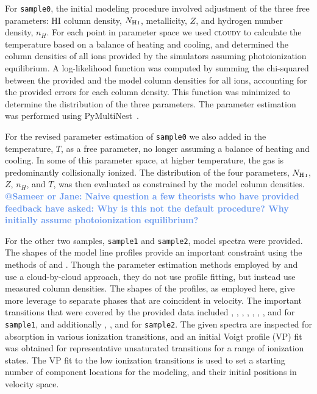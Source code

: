 \documentclass[fleqn,usenatbib]{mnras}
\makeatletter
\newcommand{\atsameer}[1]{\textcolor{CornflowerBlue}{\textbf{@Sameer or Jane: #1}}}
\makeatother
\begin{document}
For \texttt{sample0}, the initial modeling procedure involved adjustment of the three free parameters:
HI column density, $N_{\ion{H}{I}}$, metallicity, $Z$, and hydrogen number density, $n_H$.
For each point in parameter space we used \textsc{cloudy} to calculate the temperature based on a balance of heating and cooling,
and determined the column densities of all ions provided by the simulators assuming photoionization equilibrium.
A log-likelihood function was computed by summing the chi-squared between the provided and the model column densities for all ions, accounting for the provided errors for each column density.
This function was minimized to determine the distribution of the three parameters.
The parameter estimation was performed using PyMultiNest~\citep{buchner2014Statistical}. 

For the revised parameter estimation of \texttt{sample0} we also added in the temperature, $T$, as a free parameter, no longer assuming a balance of heating and cooling.
In some of this parameter space, at higher temperature, the gas is predominantly collisionally ionized.
The distribution of the four parameters, $N_{\ion{H}{I}}$, $Z$, $n_H$, and $T$, was then evaluated as constrained by the model column densities.
\atsameer{Naive question a few theorists who have provided feedback have asked: Why is this not the default procedure? Why initially assume photoionization equilibrium?}

For the other two samples, \texttt{sample1} and \texttt{sample2}, model spectra were provided.
The shapes of the model line profiles provide an important constraint using the methods of \cite{sameer2021Cloudbycloud} and \cite{sameer2022Probing}.
Though the  parameter estimation methods employed by \cite{zahedy2019Probing} and \cite{haislmaier2021COS} use a cloud-by-cloud approach, they do not use profile fitting, but instead use measured column densities.
The shapes of the profiles, as employed here, give more leverage to separate phases that are coincident in velocity.
The important transitions that were covered by the provided  data included , , , , , , , and  for \texttt{sample1}, and additionally , , and  for \texttt{sample2}.
The given spectra are inspected for absorption in various ionization transitions, and an initial Voigt profile (VP) fit was obtained for representative unsaturated transitions for a range of ionization states.
The VP fit to the low ionization transitions is used to set a starting number of component locations for the modeling, and their initial positions in velocity space.
\end{document}
